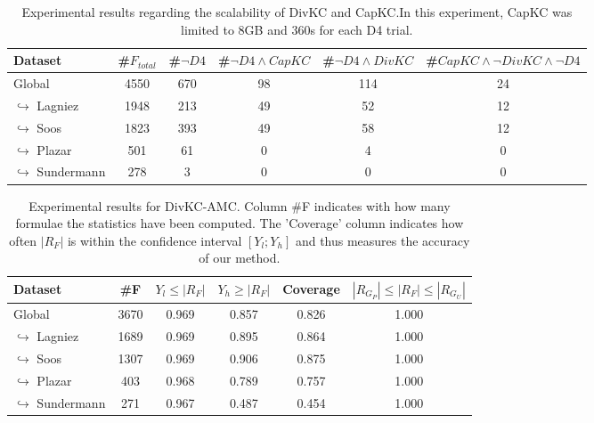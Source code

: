\documentclass{article}
\newcommand\dfour[0]{D4\xspace}
\newcommand\divkc[0]{DivKC\xspace}
\newcommand\divkcamc[0]{DivKC-AMC\xspace}
\newcommand\capkc[0]{CapKC\xspace}
\begin{document}
    
\begin{table}[h!]
        \centering
        \begin{tabular}{l|c|c|c|c|c}
            Dataset & \#$F_\textit{total}$ & \#$\neg \textit{\dfour}$ & \#$\neg \textit{\dfour} \land \textit{\capkc}$ & \#$\neg \textit{\dfour} \land \textit{\divkc}$ &  \#$\textit{\capkc} \land \neg \textit{\divkc} \land \neg \textit{\dfour}$\\ 
            \hline
Global & 4550 & 670 & 98 & 114 & 24 \\
$\hookrightarrow$ Lagniez \cite{D4} & 1948 & 213 & 49 & 52 & 12 \\
$\hookrightarrow$ Soos \cite{soos_2024_10449477} & 1823 & 393 & 49 & 58 & 12 \\
$\hookrightarrow$ Plazar \cite{Plazar2019} & 501 & 61 & 0 & 4 & 0 \\
$\hookrightarrow$ Sundermann \cite{SBK+:SPLC24} & 278 & 3 & 0 & 0 & 0 \\
    \end{tabular}
            \caption{Experimental results regarding the scalability of \divkc and \capkc.In this experiment, \capkc was limited to 8GB and 360s for each \dfour trial.
        }
        \label{divkc:tab:gen}
    \end{table}

    
\begin{table}[h!]
        \centering
            \begin{tabular}{l|c|c|c|c|c}
                Dataset & \#F & $Y_l \leq |R_F|$ & $Y_h \geq |R_F|$ & Coverage & $|R_{G_P}| \leq |R_F| \leq |R_{G_U}|$ \\
                \hline
Global & 3670 & 0.969 & 0.857 & 0.826 & 1.000 \\
$\hookrightarrow$ Lagniez \cite{D4} & 1689 & 0.969 & 0.895 & 0.864 & 1.000 \\
$\hookrightarrow$ Soos \cite{soos_2024_10449477} & 1307 & 0.969 & 0.906 & 0.875 & 1.000 \\
$\hookrightarrow$ Plazar \cite{Plazar2019} & 403 & 0.968 & 0.789 & 0.757 & 1.000 \\
$\hookrightarrow$ Sundermann \cite{SBK+:SPLC24} & 271 & 0.967 & 0.487 & 0.454 & 1.000 \\
        \end{tabular}
        \caption{Experimental results for \divkcamc.
            Column \#F indicates with how many formulae the statistics have been computed.
            The 'Coverage' column indicates how often $|R_F|$ is within the confidence interval $[Y_l; Y_h]$ and thus measures the accuracy of our method.
        }
        \label{divkc:tab:appmc}
    \end{table}
\end{document}
